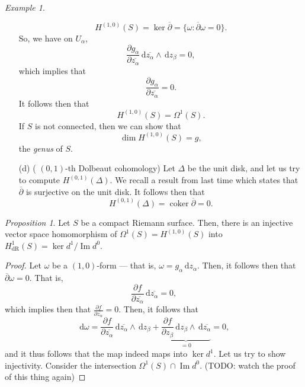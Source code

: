 \documentclass[a4paper]{report}
\theoremstyle{definition}
\theoremstyle{remark}
\theoremstyle{proposition}
\newtheorem{proposition}{Proposition}
\theoremstyle{conjecture}
\theoremstyle{lemma}
\theoremstyle{corollary}
\theoremstyle{exercise}
\theoremstyle{example}
\newtheorem{example}{Example}
\newcommand{\diff}{\,\mathrm{d}}
\newcommand{\on}{\operatorname}
\begin{document}
\begin{example}
\begin{itemize}
            $$H^{(1,0)}(S) = \ker\overline{\partial} = \lbrace \omega : \overline{\partial}\omega = 0\rbrace.$$
            So, we have on $U_\alpha$, 
            $$\frac{\partial g_\alpha}{\partial \overline{z_\alpha}} \diff\overline{z_\alpha}\wedge \diff z_\beta  =0,$$
            which implies that 
            $$\frac{\partial g_\alpha}{\partial \overline{z_\alpha}} = 0.$$
            It follows then that 
            $$H^{(1,0)}(S) = \Omega^1(S).$$
            If $S$ is not connected, then we can show that 
            $$\dim H^{(1,0)}(S) = g,$$
            the \emph{genus} of $S$.
        \item[(d)] ( $(0,1)$-th Dolbeaut cohomology)
            Let $\Delta$ be the unit disk, and let us try to compute 
            $H^{(0,1)}(\Delta)$. We recall a result from last time which 
            states that $\overline{\partial}$ is surjective on the unit disk.
            It follows then that 
            $$H^{(0,1)}(\Delta) = \on{coker}\overline{\partial} = 0.$$
    \end{itemize}
\end{example}

\begin{proposition}
    Let $S$ be a compact Riemann surface. Then,
    there is an injective vector space homomorphism of 
    $\Omega^1(S) = H^{(1,0)}(S)$ into $H^1_{\on{dR}}(S) = \ker d^1/\on{Im}d^0$.
\end{proposition}

\begin{proof}
    Let $\omega$ be a $(1,0)$-form --- that is, $\omega = g_\alpha\diff z_\alpha$.
    Then, it follows then that $\overline{\partial} \omega = 0$.
    That is, $$\frac{\partial f}{\partial \overline{z_\alpha}}\diff \overline{z_\alpha} = 0,$$
    which implies then that $\frac{\partial f}{\partial \overline{z_\alpha}}=0$.
    Then, it follows that $$\diff \omega = \frac{\partial f}{\partial \overline{z_\alpha}} \diff \overline{z_\alpha}\wedge \diff z_\beta + \underbrace{\frac{\partial f}{\partial z_\beta}\diff z_\beta \wedge \diff \overline{z_\alpha}}_{=0}=0,$$
    and it thus follows that the map indeed maps into $\ker d^1$.
    Let us try to show injectivity. Consider the 
    intersection $\Omega^1(S) \cap \on{Im}d^0$. 
    (TODO: watch the proof of this thing again)
\end{proof}
\end{document}
